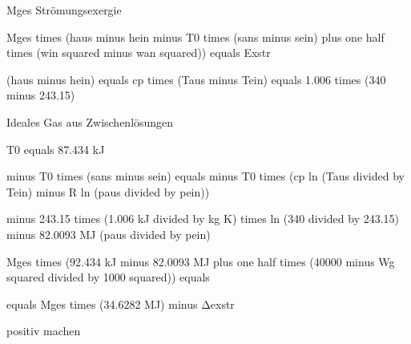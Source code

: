 Mges Strömungsexergie

Mges times (haus minus hein minus T0 times (sans minus sein) plus one half times (win squared minus wan squared)) equals Exstr

(haus minus hein) equals cp times (Taus minus Tein) equals 1.006 times (340 minus 243.15)

Ideales Gas aus Zwischenlösungen

T0 equals 87.434 kJ

minus T0 times (sans minus sein) equals minus T0 times (cp ln (Taus divided by Tein) minus R ln (paus divided by pein))

minus 243.15 times (1.006 kJ divided by kg K) times ln (340 divided by 243.15) minus 82.0093 MJ (paus divided by pein)

Mges times (92.434 kJ minus 82.0093 MJ plus one half times (40000 minus Wg squared divided by 1000 squared)) equals

equals Mges times (34.6282 MJ) minus Δexstr

positiv machen